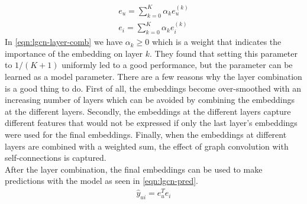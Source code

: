 \begin{align}\label{eqn:lgcn-layer-comb}
    e_{u} = \sum_{k=0}^K \alpha_k e_{u}^{(k)} \nonumber\\
    e_{i} = \sum_{k=0}^K \alpha_k e_{i}^{(k)}
\end{align}
In \autoref{eqn:lgcn-layer-comb} we have $\alpha_k \geq 0$ which is a weight that indicates the importance of the embedding on layer $k$.
They found that setting this parameter to $1/(K+1)$ uniformly led to a good performance, but the parameter can be learned as a model parameter.
There are a few reasons why the layer combination is a good thing to do.
First of all, the embeddings become over-smoothed with an increasing number of layers which can be avoided by combining the embeddings at the different layers.
Secondly, the embeddings at the different layers capture different features that would not be expressed if only the last layer's embeddings were used for the final embeddings.
Finally, when the embeddings at different layers are combined with a weighted sum, the effect of graph convolution with self-connections is captured.
\\
After the layer combination, the final embeddings can be used to make predictions with the model as seen in \autoref{eqn:lgcn-pred}.
\begin{align}\label{eqn:lgcn-pred}
    \hat{y}_{ui} = e_{u}^T e_i
\end{align}
